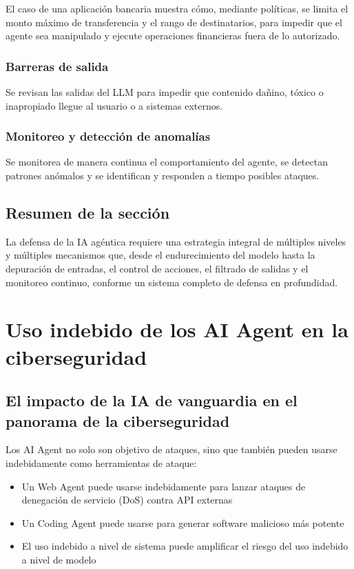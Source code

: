 \documentclass[a4paper]{article}
\begin{document}
El caso de una aplicación bancaria muestra cómo, mediante políticas, se limita el monto máximo de transferencia y el rango de destinatarios, para impedir que el agente sea manipulado y ejecute operaciones financieras fuera de lo autorizado.

\subsubsection{Barreras de salida}

Se revisan las salidas del LLM para impedir que contenido dañino, tóxico o inapropiado llegue al usuario o a sistemas externos.

\subsubsection{Monitoreo y detección de anomalías}

Se monitorea de manera continua el comportamiento del agente, se detectan patrones anómalos y se identifican y responden a tiempo posibles ataques.

\subsection{Resumen de la sección}

La defensa de la IA agéntica requiere una estrategia integral de múltiples niveles y múltiples mecanismos que, desde el endurecimiento del modelo hasta la depuración de entradas, el control de acciones, el filtrado de salidas y el monitoreo continuo, conforme un sistema completo de defensa en profundidad.

\section{Uso indebido de los AI Agent en la ciberseguridad}

\subsection{El impacto de la IA de vanguardia en el panorama de la ciberseguridad}

Los AI Agent no solo son objetivo de ataques, sino que también pueden usarse indebidamente como herramientas de ataque:
\begin{itemize}
    \item Un Web Agent puede usarse indebidamente para lanzar ataques de denegación de servicio (DoS) contra API externas
    \item Un Coding Agent puede usarse para generar software malicioso más potente
    \item El uso indebido a nivel de sistema puede amplificar el riesgo del uso indebido a nivel de modelo
\end{itemize}
\end{document}
